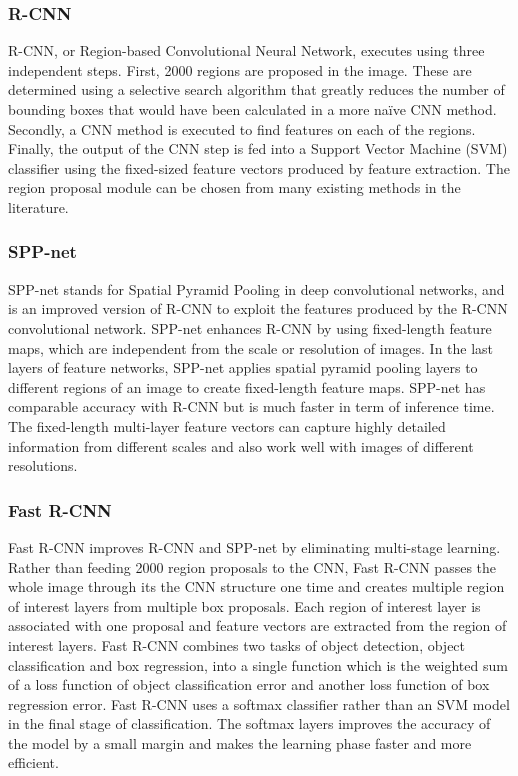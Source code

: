 \documentclass[conference]{IEEEtran}
\begin{document}
\subsubsection{R-CNN}
R-CNN, or Region-based Convolutional Neural Network, executes using three independent steps.  First, 2000 regions are proposed in the image.  These are determined using a selective search algorithm that greatly reduces the number of bounding boxes that would have been calculated in a more na\"{i}ve CNN method.  Secondly, a CNN method is executed to find features on each of the regions.  Finally, the output of the CNN step is fed into a Support Vector Machine (SVM) classifier using the fixed-sized feature vectors produced by feature extraction.
The region proposal module can be chosen from many existing methods in the literature.   

\subsubsection{SPP-net}
SPP-net stands for Spatial Pyramid Pooling in deep convolutional networks, and is an improved version of R-CNN to exploit the features produced by the R-CNN convolutional network. 
SPP-net enhances R-CNN by using fixed-length feature maps, which are independent from the scale or resolution of images. In the last layers of feature networks, SPP-net applies spatial pyramid pooling layers to different regions of an image to create fixed-length feature maps.
SPP-net has comparable accuracy with R-CNN but is much faster in term of inference time. 
The fixed-length multi-layer feature vectors can capture highly detailed information from different scales and also work well with images of different resolutions.

\subsubsection{Fast R-CNN}
Fast R-CNN improves R-CNN and SPP-net by eliminating multi-stage learning. 
Rather than feeding 2000 region proposals to the CNN, Fast R-CNN passes the whole image through its the CNN structure one time and creates multiple region of interest layers from multiple box proposals. 
Each region of interest layer is associated with one proposal and feature vectors are extracted from the region of interest layers.
Fast R-CNN combines two tasks of object detection, object classification and box regression, into a single function which is the weighted sum of a loss function of object classification error and another loss function of box regression error.
Fast R-CNN uses a softmax classifier rather than an SVM model in the final stage of classification. The softmax layers improves the accuracy of the model by a small margin  and makes the learning phase faster and more efficient.
\end{document}
